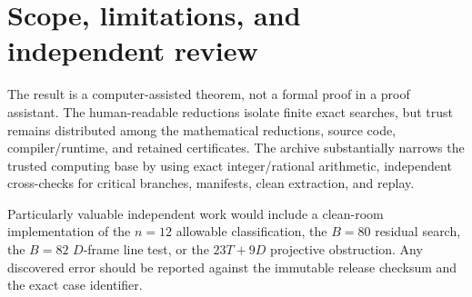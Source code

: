 \section{Scope, limitations, and independent review}

The result is a computer-assisted theorem, not a formal proof in a proof assistant.  The human-readable reductions isolate finite exact searches, but trust remains distributed among the mathematical reductions, source code, compiler/runtime, and retained certificates.  The archive substantially narrows the trusted computing base by using exact integer/rational arithmetic, independent cross-checks for critical branches, manifests, clean extraction, and replay.

Particularly valuable independent work would include a clean-room implementation of the $n=12$ allowable classification, the $B=80$ residual search, the $B=82$ $D$-frame line test, or the $23T+9D$ projective obstruction.  Any discovered error should be reported against the immutable release checksum and the exact case identifier.

